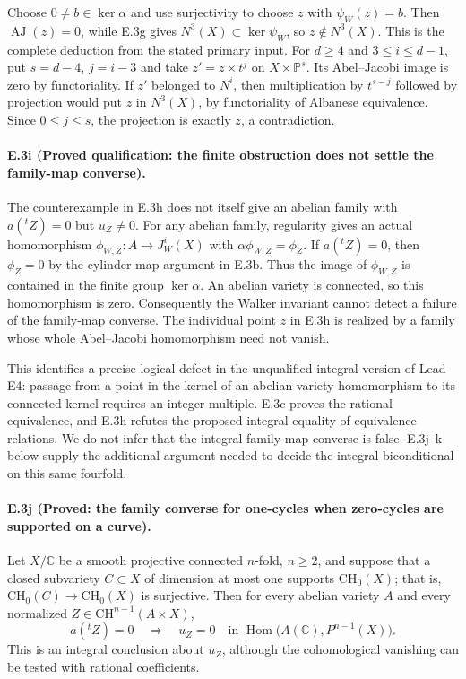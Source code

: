 Choose $0\ne b\in\ker\alpha$ and use surjectivity to choose
$z$ with $\psi_W(z)=b$. Then $\operatorname{AJ}(z)=0$, while
E.3g gives $N^3(X)\subset\ker\psi_W$, so $z\notin N^3(X)$.
This is the complete deduction from the stated primary input.
For $d\ge4$ and $3\le i\le d-1$, put $s=d-4$, $j=i-3$ and
take $z'=z\times t^j$ on $X\times\mathbb P^s$. Its Abel--Jacobi
image is zero by functoriality. If $z'$ belonged to $N^i$, then
multiplication by $t^{s-j}$ followed by projection would put $z$
in $N^3(X)$, by functoriality of Albanese equivalence. Since
$0\le j\le s$, the projection is exactly $z$, a contradiction.

\paragraph{E.3i (Proved qualification: the finite obstruction does not settle
the family-map converse).}
The counterexample in E.3h does not itself give an abelian family
with $a({}^tZ)=0$ but $u_Z\ne0$. For any abelian family, regularity
gives an actual homomorphism
$\phi_{W,Z}:A\to J_W^i(X)$ with
$\alpha\phi_{W,Z}=\phi_Z$. If $a({}^tZ)=0$, then
$\phi_Z=0$ by the cylinder-map argument in E.3b. Thus the image
of $\phi_{W,Z}$ is contained in the finite group $\ker\alpha$.
An abelian variety is connected, so this homomorphism is zero.
Consequently the Walker invariant cannot detect a failure of the
family-map converse. The individual point $z$ in E.3h is realized
by a family whose whole Abel--Jacobi homomorphism need not vanish.

This identifies a precise logical defect in the unqualified
integral version of Lead E4: passage from a point in the kernel
of an abelian-variety homomorphism to its connected kernel requires
an integer multiple. E.3c proves the rational equivalence, and
E.3h refutes the proposed integral equality of equivalence relations.
We do not infer that the integral family-map converse is false.
E.3j--k below supply the additional argument needed to decide the
integral biconditional on this same fourfold.

\paragraph{E.3j (Proved: the family converse for one-cycles when zero-cycles
are supported on a curve).}
Let $X/\mathbb C$ be a smooth projective connected $n$-fold,
$n\ge2$, and suppose that a closed subvariety $C\subset X$
of dimension at most one supports $\mathrm{CH}_0(X)$; that is,
$\mathrm{CH}_0(C)\to\mathrm{CH}_0(X)$ is surjective. Then for
every abelian variety $A$ and every normalized
$Z\in\mathrm{CH}^{n-1}(A\times X)$,
\[
 a({}^tZ)=0\quad\Longrightarrow\quad u_Z=0
 \quad\text{in }\operatorname{Hom}\bigl(A(\mathbb C),P^{n-1}(X)\bigr).
\]
This is an integral conclusion about $u_Z$, although the
cohomological vanishing can be tested with rational coefficients.

